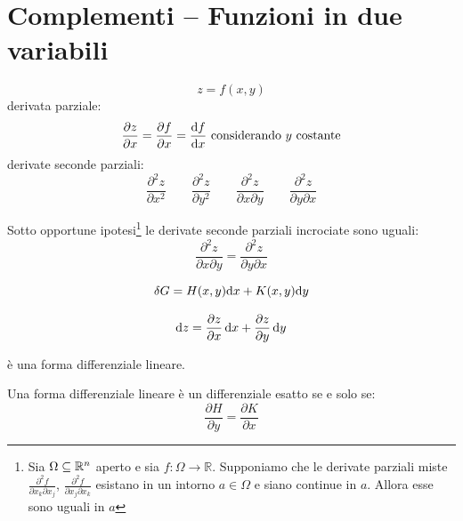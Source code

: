 \section{Complementi -- Funzioni in due variabili}

\begin{equation*}z=f(x,y)\end{equation*}
derivata parziale:
\begin{equation*}\frac{\partial z}{\partial x}=\frac{\partial f}{\partial x}=\frac{\ud f}{\ud x}\ \text{considerando $y$ costante}\end{equation*}
derivate seconde parziali:
$$
\frac{\partial^2 z}{\partial x^2}\qquad \frac{\partial^2
z}{\partial y^2}\qquad \frac{\partial^2 z}{\partial x\partial
y}\qquad\frac{\partial^2 z}{\partial y\partial x}$$
\begin{Teo}[Shwartz]
Sotto opportune ipotesi\footnote{Sia $\Omega\subseteq\mathbb{R}^n$ aperto e sia $f:\Omega\to\mathbb{R}$. Supponiamo che le derivate parziali miste $\frac{\partial^2 f}{\partial x_k\partial x_j}$, $\frac{\partial^2 f}{\partial x_j\partial x_k}$ esistano in un intorno $a\in\Omega$ e siano continue in $a$. Allora esse sono uguali in $a$} le derivate seconde parziali incrociate sono uguali:
\begin{equation*}\frac{\partial^2 z}{\partial x\partial y}=\frac{\partial^2 z}{\partial y\partial x}\end{equation*}
\end{Teo}
\begin{Def}
\begin{equation*}\delta G=H(x,y)\mathrm{d} x+K(x,y)\mathrm{d} y\end{equation*}
\end{Def}
\begin{Def}
\begin{equation*}\mathrm{d} z=\frac{\partial z}{\partial x}\,\mathrm{d} x+\frac{\partial z}{\partial y}\,\mathrm{d} y\end{equation*}
\end{Def}
è una forma differenziale lineare.
\begin{Teo}
 Una forma differenziale lineare è un differenziale esatto se e
solo se:
\begin{equation*}\frac{\partial H}{\partial y}=\frac{\partial K}{\partial x}\end{equation*}
\end{Teo}
